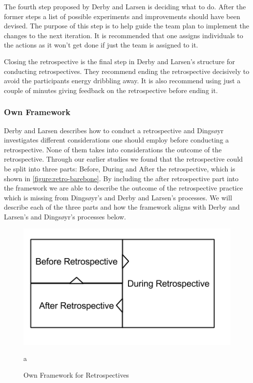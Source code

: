The fourth step proposed by Derby and Larsen is deciding what to do. After the former steps a list of possible experiments and improvements should have been devised. The purpose of this step is to help guide the team plan to implement the changes to the next iteration. It is recommended that one assigns individuals to the actions as it won't get done if just the team is assigned to it. 

Closing the retrospective is the final step in Derby and Larsen's structure for conducting retrospectives. They recommend ending the retrospective decisively to avoid the participants energy dribbling away. It is also recommend using just a couple of minutes giving feedback on the retrospective before ending it. 

\subsubsection{Own Framework}
\label{subsubsec:own-framework}
Derby and Larsen describes how to conduct a retrospective and Dingsøyr investigates different considerations one should employ before conducting a retrospective. None of them takes into considerations the outcome of the retrospective. Through our earlier studies \cite{Dolvik2014} we found that the retrospective could be split into three parts: Before, During and After the retrospective, which is shown in \autoref{figure:retro-barebone}. By including the after retrospective part into the framework we are able to describe the outcome of the retrospective practice which is missing from Dingsøyr's and Derby and Larsen's processes. We will describe each of the three parts and how the framework aligns with Derby and Larsen's and Dingsøyr's processes below. 

\begin{figure}[!h]
	\centering
	\includegraphics[width=\textwidth, keepaspectratio]{figures/retro-barebone.png}
	\caption{Own Framework for Retrospectives}
	\label{figure:retro-barebone}a
\end{figure}

